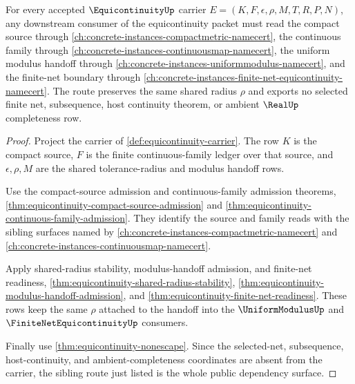 \begin{theorem}
\label{thm:equicontinuity-root-unblock-shared-modulus-scope}
For every accepted $\EquicontinuityUp$ carrier $E=(K,F,\epsilon,\rho,M,T,R,P,N)$, any downstream consumer of the equicontinuity packet must read the compact source through \autoref{ch:concrete-instances-compactmetric-namecert}, the continuous family through \autoref{ch:concrete-instances-continuousmap-namecert}, the uniform modulus handoff through \autoref{ch:concrete-instances-uniformmodulus-namecert}, and the finite-net boundary through \autoref{ch:concrete-instances-finite-net-equicontinuity-namecert}. The route preserves the same shared radius $\rho$ and exports no selected finite net, subsequence, host continuity theorem, or ambient $\RealUp$ completeness row.
\end{theorem}
\begin{proof}
Project the carrier of \autoref{def:equicontinuity-carrier}. The row $K$ is the compact source, $F$ is the finite continuous-family ledger over that source, and $\epsilon,\rho,M$ are the shared tolerance-radius and modulus handoff rows.

Use the compact-source admission and continuous-family admission theorems, \autoref{thm:equicontinuity-compact-source-admission} and \autoref{thm:equicontinuity-continuous-family-admission}. They identify the source and family reads with the sibling surfaces named by \autoref{ch:concrete-instances-compactmetric-namecert} and \autoref{ch:concrete-instances-continuousmap-namecert}.

Apply shared-radius stability, modulus-handoff admission, and finite-net readiness, \autoref{thm:equicontinuity-shared-radius-stability}, \autoref{thm:equicontinuity-modulus-handoff-admission}, and \autoref{thm:equicontinuity-finite-net-readiness}. These rows keep the same $\rho$ attached to the handoff into the $\UniformModulusUp$ and $\FiniteNetEquicontinuityUp$ consumers.

Finally use \autoref{thm:equicontinuity-nonescape}. Since the selected-net, subsequence, host-continuity, and ambient-completeness coordinates are absent from the carrier, the sibling route just listed is the whole public dependency surface.
\end{proof}

